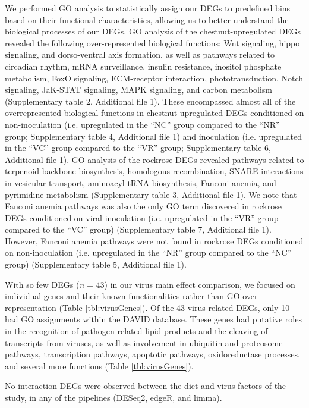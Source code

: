 \documentclass{bmcart}
\begin{document}
\begin{linenumbers}
\begin{doublespacing}
We performed GO analysis to statistically assign our DEGs to predefined bins based on their functional characteristics, allowing us to better understand the biological processes of our DEGs. GO analysis of the chestnut-upregulated DEGs revealed the following over-represented biological functions: Wnt signaling, hippo signaling, and dorso-ventral axis formation, as well as pathways related to circadian rhythm, mRNA surveillance, insulin resistance, inositol phosphate metabolism, FoxO signaling, ECM-receptor interaction, phototransduction, Notch signaling, JaK-STAT signaling, MAPK signaling, and carbon metabolism (Supplementary table 2, Additional file 1). These encompassed almost all of the overrepresented biological functions in chestnut-upregulated DEGs conditioned on non-inoculation (i.e. upregulated in the ``NC'' group compared to the ``NR'' group; Supplementary table 4, Additional file 1) and inoculation (i.e. upregulated in the ``VC'' group compared to the ``VR'' group; Supplementary table 6, Additional file 1). GO analysis of the rockrose DEGs revealed pathways related to terpenoid backbone biosynthesis, homologous recombination, SNARE interactions in vesicular transport, aminoacyl-tRNA biosynthesis, Fanconi anemia, and pyrimidine metabolism (Supplementary table 3, Additional file 1). We note that Fanconi anemia pathways was also the only GO term discovered in rockrose DEGs conditioned on viral inoculation (i.e. upregulated in the ``VR'' group compared to the ``VC'' group) (Supplementary table 7, Additional file 1). However, Fanconi anemia pathways were not found in rockrose DEGs conditioned on non-inoculation (i.e. upregulated in the ``NR'' group compared to the ``NC'' group) (Supplementary table 5, Additional file 1).

With so few DEGs (\textit{n} = 43) in our virus main effect comparison, we focused on individual genes and their known functionalities rather than GO over-representation (Table \ref{tbl:virusGenes}). Of the 43 virus-related DEGs, only 10 had GO assignments within the DAVID database. These genes had putative roles in the recognition of pathogen-related lipid products and the cleaving of transcripts from viruses, as well as involvement in ubiquitin and proteosome pathways, transcription pathways, apoptotic pathways, oxidoreductase processes, and several more functions (Table \ref{tbl:virusGenes}).

No interaction DEGs were observed between the diet and virus factors of the study, in any of the pipelines (DESeq2, edgeR, and limma).


\end{doublespacing}
\end{linenumbers}
\end{document}
